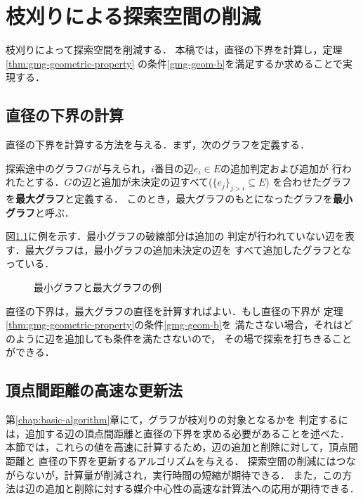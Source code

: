 
\chapter{枝刈りによる探索空間の削減}
\label{chap:reduce-by-prune}
枝刈りによって探索空間を削減する．
本稿では，直径の下界を計算し，定理\ref{thm:gmg-geometric-property}
の条件\ref{gmg-geom-b}を満足するか求めることで実現する．

\section{直径の下界の計算}
\label{sect:distance-lower-bound}
直径の下界を計算する方法を与える．まず，次のグラフを定義する．
\begin{definition}
  探索途中のグラフ$G$が与えられ，$i$番目の辺$e_i\in E$の追加判定および追加が
  行われたとする．$G$の辺と追加が未決定の辺すべて($\{e_j\}_{j>i}\subseteq E$)
  を合わせたグラフを\textbf{最大グラフ}と定義する．
  このとき，最大グラフのもとになったグラフを\textbf{最小グラフ}と呼ぶ．
\end{definition}
\begin{example}
  図\ref{fig:min-max-graph}に例を示す．最小グラフの破線部分は追加の
  判定が行われていない辺を表す．最大グラフは，最小グラフの追加未決定の辺を
  すべて追加したグラフとなっている．
\end{example}
\begin{figure}
  \centering
  \hfill
  \caption{最小グラフと最大グラフの例}
  \label{fig:min-max-graph}
\end{figure}

直径の下界は，最大グラフの直径を計算すればよい．もし直径の下界が
定理\ref{thm:gmg-geometric-property}の条件\ref{gmg-geom-b}を
満たさない場合，それはどのように辺を追加しても条件を満たさないので，
その場で探索を打ちきることができる．

\section{頂点間距離の高速な更新法}
\label{sect:faster-min-max}
第\ref{chap:basic-algorithm}章にて，グラフが枝刈りの対象となるかを
判定するには，追加する辺の頂点間距離と直径の下界を求める必要があることを述べた．
本節では，これらの値を高速に計算するため，辺の追加と削除に対して，頂点間距離と
直径の下界を更新するアルゴリズムを与える．
探索空間の削減にはつながらないが，計算量が削減され，実行時間の短縮が期待できる．
また，この方法は辺の追加と削除に対する媒介中心性の高速な計算法への応用が期待できる．

